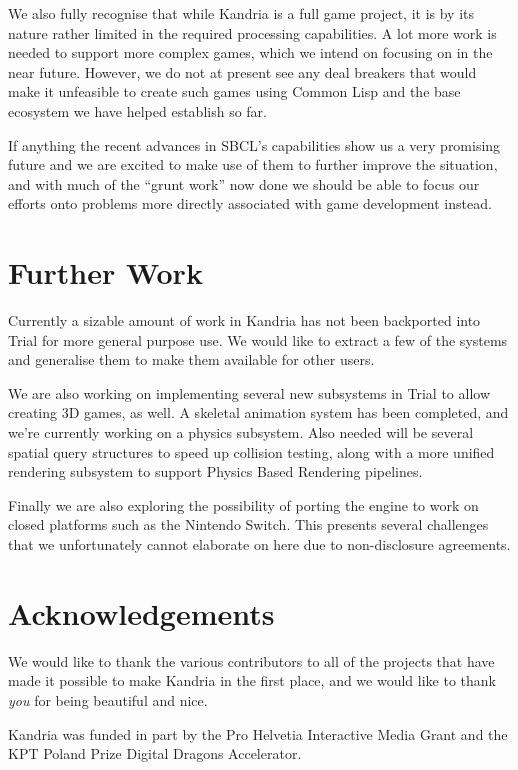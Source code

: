 \documentclass[format=sigconf]{acmart}
\begin{document}
We also fully recognise that while Kandria is a full game project, it is by its nature rather limited in the required processing capabilities. A lot more work is needed to support more complex games, which we intend on focusing on in the near future. However, we do not at present see any deal breakers that would make it unfeasible to create such games using Common Lisp and the base ecosystem we have helped establish so far.

If anything the recent advances in SBCL's capabilities show us a very promising future and we are excited to make use of them to further improve the situation, and with much of the ``grunt work'' now done we should be able to focus our efforts onto problems more directly associated with game development instead.

\section{Further Work}\label{further-work}
Currently a sizable amount of work in Kandria has not been backported into Trial for more general purpose use. We would like to extract a few of the systems and generalise them to make them available for other users.

We are also working on implementing several new subsystems in Trial to allow creating 3D games, as well. A skeletal animation system has been completed, and we're currently working on a physics subsystem. Also needed will be several spatial query structures to speed up collision testing, along with a more unified rendering subsystem to support Physics Based Rendering pipelines.

Finally we are also exploring the possibility of porting the engine to work on closed platforms such as the Nintendo Switch. This presents several challenges that we unfortunately cannot elaborate on here due to non-disclosure agreements.

\section{Acknowledgements}\label{acknowledgements}
We would like to thank the various contributors to all of the projects that have made it possible to make Kandria in the first place, and we would like to thank \textit{you} for being beautiful and nice.

Kandria was funded in part by the Pro Helvetia Interactive Media Grant and the KPT Poland Prize Digital Dragons Accelerator.

\end{document}
